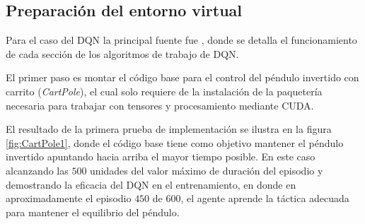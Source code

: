 \subsection{Preparación del entorno virtual}

Para el caso del DQN la principal fuente fue \cite{PytorchDQN}, donde se detalla el funcionamiento de cada sección de los algoritmos de trabajo de DQN. 

El primer paso es montar el código base para el control del péndulo invertido con carrito (\textit{CartPole}), el cual solo requiere de la instalación de la paquetería necesaria para trabajar con tensores y procesamiento mediante CUDA.

El resultado de la primera prueba de implementación se ilustra en la figura \ref{fig:CartPole1}, donde el código base tiene como objetivo mantener el péndulo invertido apuntando hacia arriba el mayor tiempo posible. En este caso alcanzando las $500$ unidades del valor máximo de duración del episodio y demostrando la eficacia del DQN en el entrenamiento, en donde en aproximadamente el episodio $450$ de $600$, el agente aprende la táctica adecuada para mantener el equilibrio del péndulo.




